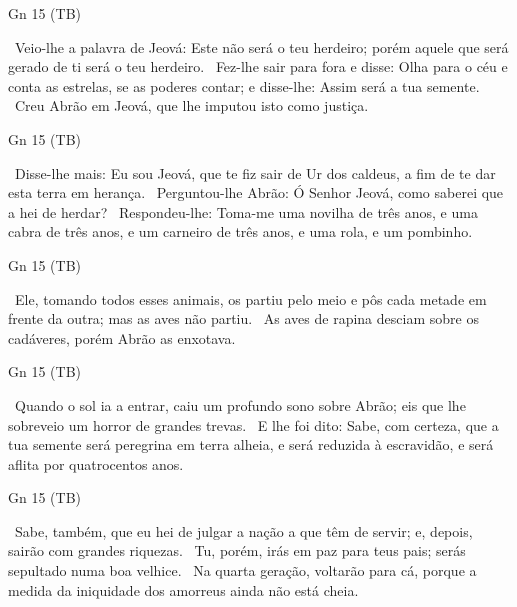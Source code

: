 \documentclass[12pt,aspectratio=169]{beamer}
\newcommand{\ver}[1]{%
    \raisebox{0.50ex}{%
        \scalebox{1.1}{%
            \pmb{\textbf{\textcolor{BSpbg}{#1}}}%
        }%
    }%
}
\newcommand{\QUOTE}[1]{%
    \par\noindent\hspace*{0.05\linewidth}%
    \begin{minipage}{0.9\linewidth}%
        \linespread{1.35}\large{#1}%
    \end{minipage}%
}
\newcommand{\RED}[1]{{\textcolor{TXred}{#1}}}
\newcommand{\ORA}[1]{{\textcolor{TXred!50!TXyel}{#1}}}
\newcommand{\YEL}[1]{{\textcolor{TXyel}{#1}}}
\newcommand{\GRE}[1]{{\textcolor{TXgre}{#1}}}
\newcommand{\CYA}[1]{{\textcolor{TXcya}{#1}}}
\begin{document}
    \begin{frame}{Gn 15 (TB)}
        \QUOTE{%
            \ver{4}~Veio-lhe a palavra de Jeová: Este não será o teu herdeiro; porém aquele que
            será \YEL{gerado de ti} será o teu herdeiro.
            \ver{5}~Fez-lhe sair para fora e disse: Olha para o céu e \CYA{conta as estrelas},
            se as poderes contar; e disse-lhe: \YEL{Assim será a tua semente}.
            \ver{6}~\GRE{Creu} Abrão em Jeová, que \GRE{lhe imputou isto como justiça}.
        }
    \end{frame}

    \begin{frame}{Gn 15 (TB)}
        \QUOTE{%
            \ver{7}~Disse-lhe mais: Eu sou Jeová, que te fiz sair de Ur dos caldeus, a fim de te
            dar \YEL{esta terra em herança}.
            \ver{8}~Perguntou-lhe Abrão: Ó Senhor Jeová, \YEL{como saberei} que a hei de herdar?
            \ver{9}~Respondeu-lhe: \YEL{Toma-me uma novilha} de três anos, e uma cabra de três
            anos, e um carneiro de três anos, e uma rola, e um pombinho.
        }
    \end{frame}

    \begin{frame}{Gn 15 (TB)}
        \QUOTE{%
            \ver{10}~Ele, tomando todos esses animais, os partiu pelo meio e pôs cada metade em
            frente da outra; mas as aves não partiu.
            \ver{11}~As aves de rapina desciam sobre os cadáveres, porém Abrão as enxotava.
        }
    \end{frame}

    \begin{frame}{Gn 15 (TB)}
        \QUOTE{%
            \ver{12}~Quando o sol ia a entrar, caiu um \ORA{profundo sono} sobre Abrão; eis que
            lhe sobreveio um \RED{horror de grandes trevas}.
            \ver{13}~E lhe foi dito: Sabe, \YEL{com certeza}, que a \RED{tua semente será
            peregrina} em \RED{terra alheia}, e será \RED{reduzida à escravidão}, e será
            \RED{aflita} por quatrocentos anos.
        }
    \end{frame}

    \begin{frame}{Gn 15 (TB)}
        \QUOTE{%
            \ver{14}~Sabe, também, que eu hei de \RED{julgar} a nação a que têm de servir; e,
            depois, \YEL{sairão} com grandes riquezas.
            \ver{15}~Tu, porém, \YEL{irás em paz} para teus pais; serás sepultado numa boa
            \YEL{velhice}.
            \ver{16}~Na quarta geração, voltarão para cá, \YEL{porque} a \RED{medida da
            iniquidade dos amorreus ainda não está cheia}.
        }
    \end{frame}
\end{document}
